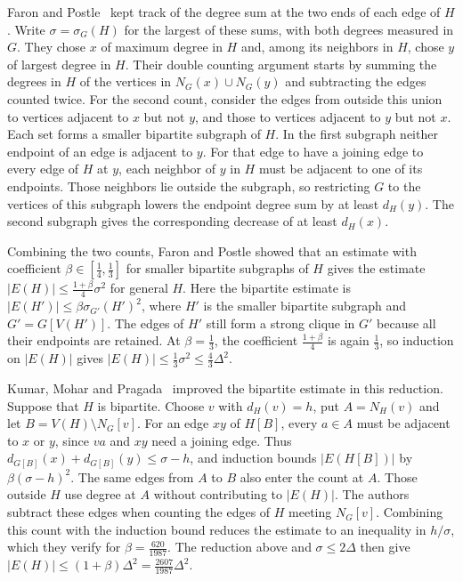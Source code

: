 Faron and Postle~\cite{FaronPostle2019} kept track of the degree sum
at the two ends of each edge of $H$. Write $\sigma=\sigma_G(H)$ for
the largest of these sums, with both degrees measured in $G$.
They chose $x$ of maximum degree in $H$ and, among its neighbors
in $H$, chose $y$ of largest degree in $H$. Their double counting
argument starts by summing the degrees in $H$ of the vertices in
$N_G(x)\cup N_G(y)$ and subtracting the edges counted twice.
For the second count, consider the edges from outside this union to
vertices adjacent to $x$ but not $y$, and those to vertices adjacent
to $y$ but not $x$. Each set forms a
smaller bipartite subgraph of $H$. In the first subgraph neither
endpoint of an edge is adjacent to $y$. For that edge to have a
joining edge to every edge of $H$ at $y$, each neighbor of $y$ in
$H$ must be adjacent to one of its endpoints. Those neighbors lie outside
the subgraph, so restricting $G$ to the vertices of this subgraph
lowers the endpoint degree sum by at least $d_H(y)$. The second
subgraph gives the corresponding decrease of at least $d_H(x)$.

Combining the two counts, Faron and Postle showed that an estimate
with coefficient $\beta\in[\frac{1}{4},\frac{1}{3}]$ for smaller
bipartite subgraphs of $H$ gives the estimate
$|E(H)|\leq\frac{1+\beta}{4}\sigma^2$ for general $H$.
Here the bipartite estimate is $|E(H')|\leq\beta\sigma_{G'}(H')^2$,
where $H'$ is the smaller bipartite subgraph and $G'=G[V(H')]$.
The edges of $H'$ still form a strong clique in $G'$ because all
their endpoints are retained. At $\beta=\frac{1}{3}$, the coefficient
$\frac{1+\beta}{4}$ is again $\frac{1}{3}$, so induction on $|E(H)|$
gives $|E(H)|\leq\frac{1}{3}\sigma^2\leq\frac{4}{3}\Delta^2$.

Kumar, Mohar and Pragada~\cite{KumarMoharPragada2026} improved the
bipartite estimate in this reduction. Suppose that $H$ is bipartite.
Choose $v$ with $d_H(v)=h$, put $A=N_H(v)$ and let
$B=V(H)\setminus N_G[v]$. For an edge $xy$ of $H[B]$, every
$a\in A$ must be adjacent to $x$ or $y$, since $va$ and $xy$ need
a joining edge. Thus $d_{G[B]}(x)+d_{G[B]}(y)\leq\sigma-h$,
and induction bounds $|E(H[B])|$ by $\beta(\sigma-h)^2$.
The same edges from $A$ to $B$ also enter the count at $A$.
Those outside $H$ use degree at $A$ without contributing to $|E(H)|$.
The authors subtract these edges when counting the edges of $H$
meeting $N_G[v]$. Combining this count with the induction bound
reduces the estimate to an inequality in $h/\sigma$, which they
verify for $\beta=\frac{620}{1987}$. The reduction above and
$\sigma\leq2\Delta$ then give
$|E(H)|\leq(1+\beta)\Delta^2=\frac{2607}{1987}\Delta^2$.

